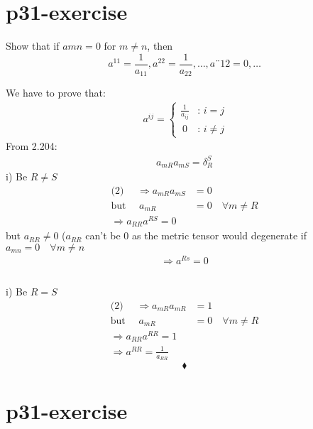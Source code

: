 \section{p31-exercise}

\begin{tcolorbox}
Show that if $a{mn} = 0$ for $m\neq n$, then $$a^{11} = \frac{1}{a_{11}}, a^{22} = \frac{1}{a_{22}}, \dots, a¨{12} = 0, \dots$$
\end{tcolorbox}
We have to prove that:
\begin{align}
\ a^{ij} = \left\{\begin{array}{cc}
\frac{1}{a_{ij}} & \text{: }i=j\\
\ 0 & \text{: }i \neq j
\end{array}\right.
\end{align}
From 2.204:
\begin{align}
a_{mR}a_{mS} = \delta^S_R
\end{align}
i) Be $R \neq S$
\begin{align}
\text{(2) }\quad \Rightarrow a_{mR}a_{mS} &= 0\\
\text{but } \quad a_{mR} &=0\quad \forall m \neq R\\
\Rightarrow a_{RR}a^{RS} = 0
\end{align}
but $a_{RR} \neq 0$ ($a_{RR}$ can't be $0$ as the metric tensor would degenerate  if $a_{mn} = 0\quad \forall m \neq n$
\begin{align}
\Rightarrow a^{Rs} = 0\\\\
\end{align}

i) Be $R = S$
\begin{align}
\text{(2) }\quad \Rightarrow a_{mR}a_{mR} &= 1\\
\text{but } \quad a_{mR} &=0\quad \forall m \neq R\\
\Rightarrow a_{RR}a^{RR} = 1\\
\Rightarrow a^{RR} = \frac{1}{a_{RR}}
\end{align}
$$\blacklozenge$$
\newpage

\section{p31-exercise}

